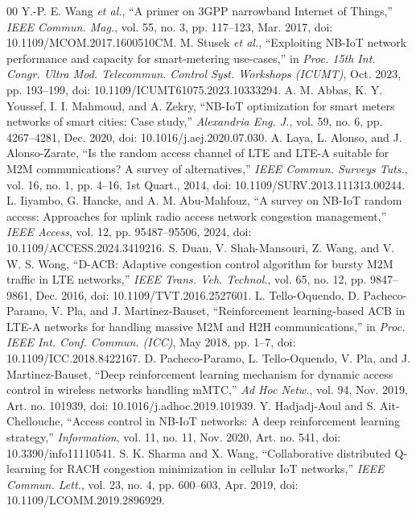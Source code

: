 \documentclass[conference]{IEEEtran}
\begin{document}
\begin{thebibliography}{00}
 Y.-P. E. Wang \emph{et al.}, ``A primer on 3GPP narrowband Internet of Things,'' \emph{IEEE Commun. Mag.}, vol. 55, no. 3, pp. 117--123, Mar. 2017, doi: 10.1109/MCOM.2017.1600510CM.
 M. Stusek \emph{et al.}, ``Exploiting NB-IoT network performance and capacity for smart-metering use-cases,'' in \emph{Proc. 15th Int. Congr. Ultra Mod. Telecommun. Control Syst. Workshops (ICUMT)}, Oct. 2023, pp. 193--199, doi: 10.1109/ICUMT61075.2023.10333294.
 A. M. Abbas, K. Y. Youssef, I. I. Mahmoud, and A. Zekry, ``NB-IoT optimization for smart meters networks of smart cities: Case study,'' \emph{Alexandria Eng. J.}, vol. 59, no. 6, pp. 4267--4281, Dec. 2020, doi: 10.1016/j.aej.2020.07.030.
 A. Laya, L. Alonso, and J. Alonso-Zarate, ``Is the random access channel of LTE and LTE-A suitable for M2M communications? A survey of alternatives,'' \emph{IEEE Commun. Surveys Tuts.}, vol. 16, no. 1, pp. 4--16, 1st Quart., 2014, doi: 10.1109/SURV.2013.111313.00244.
 L. Iiyambo, G. Hancke, and A. M. Abu-Mahfouz, ``A survey on NB-IoT random access: Approaches for uplink radio access network congestion management,'' \emph{IEEE Access}, vol. 12, pp. 95487--95506, 2024, doi: 10.1109/ACCESS.2024.3419216.
 S. Duan, V. Shah-Mansouri, Z. Wang, and V. W. S. Wong, ``D-ACB: Adaptive congestion control algorithm for bursty M2M traffic in LTE networks,'' \emph{IEEE Trans. Veh. Technol.}, vol. 65, no. 12, pp. 9847--9861, Dec. 2016, doi: 10.1109/TVT.2016.2527601.
 L. Tello-Oquendo, D. Pacheco-Paramo, V. Pla, and J. Martinez-Bauset, ``Reinforcement learning-based ACB in LTE-A networks for handling massive M2M and H2H communications,'' in \emph{Proc. IEEE Int. Conf. Commun. (ICC)}, May 2018, pp. 1--7, doi: 10.1109/ICC.2018.8422167.
 D. Pacheco-Paramo, L. Tello-Oquendo, V. Pla, and J. Martinez-Bauset, ``Deep reinforcement learning mechanism for dynamic access control in wireless networks handling mMTC,'' \emph{Ad Hoc Netw.}, vol. 94, Nov. 2019, Art. no. 101939, doi: 10.1016/j.adhoc.2019.101939.
 Y. Hadjadj-Aoul and S. Ait-Chellouche, ``Access control in NB-IoT networks: A deep reinforcement learning strategy,'' \emph{Information}, vol. 11, no. 11, Nov. 2020, Art. no. 541, doi: 10.3390/info11110541.
 S. K. Sharma and X. Wang, ``Collaborative distributed Q-learning for RACH congestion minimization in cellular IoT networks,'' \emph{IEEE Commun. Lett.}, vol. 23, no. 4, pp. 600--603, Apr. 2019, doi: 10.1109/LCOMM.2019.2896929.

\end{thebibliography}
\end{document}
